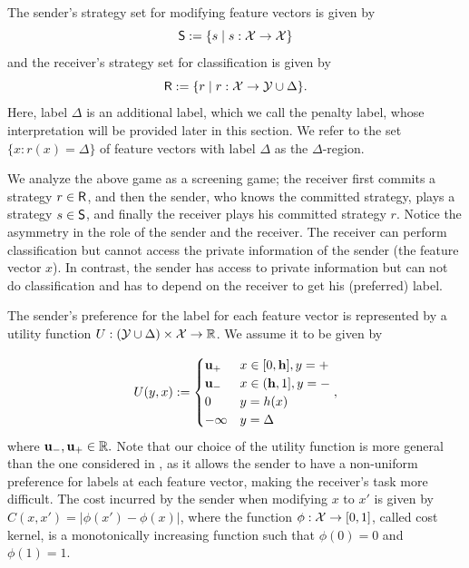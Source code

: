 The sender's strategy set for modifying feature vectors is given by
\begin{equation}\label{eqn:Sender's strategy space}
	\mathsf{S} := \{s \;|\; s: \mathcal{X} \rightarrow \mathcal{X} \}
\end{equation}
and the receiver's strategy set for classification is given by
\begin{equation}\label{eqn:Receiver's strategy space}
	\mathsf{R} := \{r\;|\; r:\mathcal{X} \rightarrow \mathcal{Y} \cup \Delta\}.
\end{equation}
Here, label $\Delta$ is an additional label, which we call the penalty label, whose interpretation will be provided later in this section. We refer to the set $\{x: r(x) = \Delta\}$ of feature vectors with label $\Delta$ as the $\Delta$-region.

We analyze the above game as a screening game;
the receiver first commits a strategy $r \in \mathsf{R}$, and then the sender, who knows the committed strategy, plays a strategy $s \in \mathsf{S}$, and finally the receiver plays his committed strategy $r$. Notice the asymmetry in the role of the sender and the receiver. The receiver can perform classification but cannot access the private information of the sender (the feature vector $x$). In contrast, the sender has access to private information but can not do classification and has to depend on the receiver to get his (preferred) label.

The sender's preference for the label for each feature vector is represented by a utility function $U: (\mathcal{Y} \cup \Delta) \times \mathcal{X} \rightarrow \mathbb{R}$. We assume it to be  given by

\begin{equation}\label{eqn:Utility}
	U(y,x) := \begin{cases}
		\mathbf{u_+} & x \in [0,\mathbf{h}], y = \mathbf{+} \\
		\mathbf{u_-} & x \in (\mathbf{h},1], y = \mathbf{-} \\
		0 & y = h(x)\\
		-\infty & y = \Delta
	\end{cases},
\end{equation}
where $\mathbf{u_-},\mathbf{u_+} \in \mathbb{R}.$
Note that our choice of the utility function is more general than the one considered in \cite{hardt2016strategic}, as it allows the sender to have a non-uniform preference for labels at each feature vector, making the receiver's task more difficult. The cost incurred by the sender when modifying $x$ to $x'$ is given by $C(x,x') = |\phi(x') - \phi(x)|$, where the function $\phi: \mathcal{X} \rightarrow [0,1]$, called cost kernel, is a monotonically increasing function such that $\phi(0) = 0$ and $\phi(1)  = 1$.


